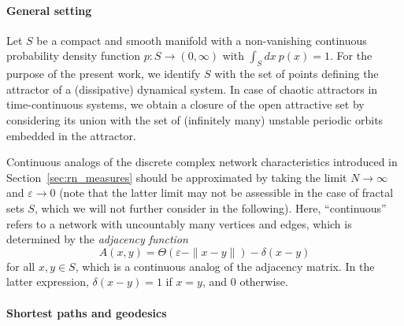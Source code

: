\paragraph{General setting}

Let $S$ be a compact and smooth manifold with a non-vanishing continuous probability density function $p:S\to(0,\infty)$ with $\int_S dx\ p(x) = 1$. For the purpose of the present work, we identify $S$ with the set of points defining the attractor of a (dissipative) dynamical system. In case of chaotic attractors in time-continuous systems, we obtain a closure of the open attractive set by considering its union with the set of (infinitely many) unstable periodic orbits embedded in the attractor.

Continuous analogs of the discrete complex network characteristics introduced in Section~\ref{sec:rn_measures} should be approximated by taking the limit $N\to\infty$ and $\varepsilon\to 0$ (note that the latter limit may not be assessible in the case of fractal sets $S$, which we will not further consider in the following). Here, ``continuous'' refers to a network with uncountably many vertices and edges, which is determined by the \emph{adjacency function}
\begin{equation}
A(x,y)=\Theta(\varepsilon-\|x-y\|)-\delta(x-y)
\end{equation}
\noindent
for all $x,y\in S$, which is a continuous analog of the adjacency matrix. In the latter expression, $\delta(x-y)=1$ if $x=y$, and $0$ otherwise.


\paragraph{Shortest paths and geodesics}

